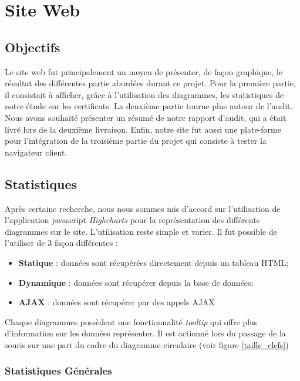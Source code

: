 \chapter{Site Web}

\section{Objectifs}

Le site web fut principalement un moyen de présenter, de façon graphique, le résultat des différentes partie abordées durant ce projet. Pour la première partie, il consistait à afficher, grâce à l'utilisation des diagrammes, les statistiques de notre étude sur les certificats. La deuxième partie tourne plus autour de l'audit. Nous avons souhaité présenter un résumé de notre rapport d'audit, qui a était livré lors de la deuxième livraison. Enfin, notre site fut aussi une plate-forme pour l'intégration de la troisième partie du projet qui consiste à tester la navigateur client. \\


\section{Statistiques}

Après certaine recherche, nous nous sommes mis d'accord sur l'utilisation de l'application javascript \textit{Highcharts} pour la représentation des différents diagrammes sur le site. L'utilisation reste simple et varier. Il fut possible de l'utiliser de 3 façon différentes : 
\begin{itemize}
\item \textbf{Statique} : données sont récupérées directement depuis un tableau HTML;
\item \textbf{Dynamique} : données sont récupérer depuis la base de données;
\item \textbf{AJAX} : données sont récupérer par des appels AJAX\\
\end{itemize}

Chaque diagrammes possèdent une fonctionnalité \textit{tooltip} qui offre plus d'information sur les données représenter. Il est actionné lors du passage de la souris sur une part du cadre du diagramme circulaire (voir figure \ref{taille_clefs})

\subsection{Statistiques Générales}

